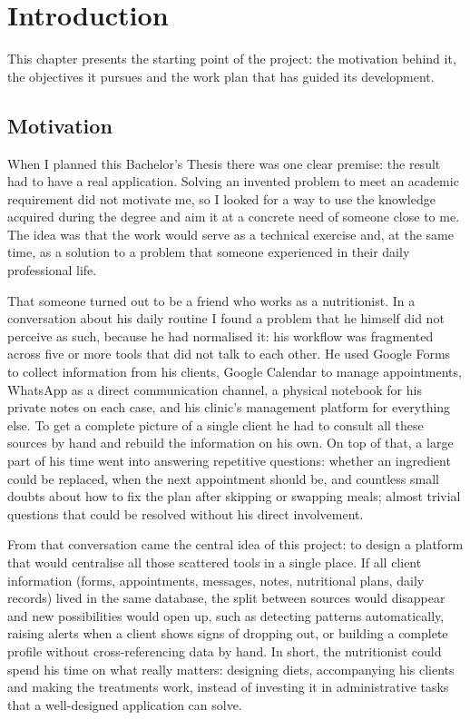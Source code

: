 \chapter*{Introduction}
\label{cap:introduction}


This chapter presents the starting point of the project: the motivation behind it, the objectives it pursues and the work plan that has guided its development.

\section*{Motivation}
When I planned this Bachelor's Thesis there was one clear premise: the result had to have a real application. Solving an invented problem to meet an academic requirement did not motivate me, so I looked for a way to use the knowledge acquired during the degree and aim it at a concrete need of someone close to me. The idea was that the work would serve as a technical exercise and, at the same time, as a solution to a problem that someone experienced in their daily professional life.

That someone turned out to be a friend who works as a nutritionist. In a conversation about his daily routine I found a problem that he himself did not perceive as such, because he had normalised it: his workflow was fragmented across five or more tools that did not talk to each other. He used Google Forms to collect information from his clients, Google Calendar to manage appointments, WhatsApp as a direct communication channel, a physical notebook for his private notes on each case, and his clinic's management platform for everything else. To get a complete picture of a single client he had to consult all these sources by hand and rebuild the information on his own. On top of that, a large part of his time went into answering repetitive questions: whether an ingredient could be replaced, when the next appointment should be, and countless small doubts about how to fix the plan after skipping or swapping meals; almost trivial questions that could be resolved without his direct involvement.

From that conversation came the central idea of this project: to design a platform that would centralise all those scattered tools in a single place. If all client information (forms, appointments, messages, notes, nutritional plans, daily records) lived in the same database, the split between sources would disappear and new possibilities would open up, such as detecting patterns automatically, raising alerts when a client shows signs of dropping out, or building a complete profile without cross-referencing data by hand. In short, the nutritionist could spend his time on what really matters: designing diets, accompanying his clients and making the treatments work, instead of investing it in administrative tasks that a well-designed application can solve.


